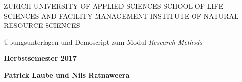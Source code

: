 
\begin{titlepage}
\begin{center}
  
{\small 
ZURICH UNIVERSITY OF APPLIED SCIENCES
\linebreak SCHOOL OF LIFE SCIENCES AND FACILITY MANAGEMENT
\linebreak INSTITUTE OF NATURAL RESOURCE SCIENCES
}

\end{center}
\vspace{1.5cm}
\begin{center}

{\Large Übungsunterlagen und Demoscript zum Modul \emph{Research Methods}}

\end{center}
 \vspace{1cm}


\begin{center}
\textbf{Herbstsemester 2017}

\textbf{Patrick Laube und Nils Ratnaweera}
\end{center} 

\vspace{1.0cm}

% 		
% 		


\end{titlepage}
